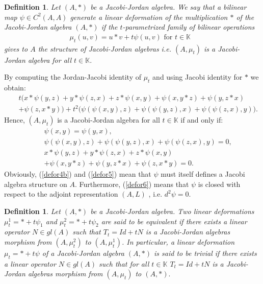 \documentclass[12pt]{amsart}
\newtheorem{definition}[Theorem]{Definition}
\begin{document}
	\begin{definition}
		Let $(A,\ast)$ be a  Jacobi-Jordan algebra. We say that a bilinear map $\psi\in C^2(A,A)$ generate a linear  deformation of the multiplication $\ast$ of the Jacobi-Jordan algebra $(A,\ast)$ if the $t$-parametrized family of bilinear operations
		\begin{eqnarray}
			\mu_t(u, v)=u\ast v+t\psi(u,v) \mbox{ for $t\in\mathbb{K}$ }
		\end{eqnarray}
		gives to $A$ the structure of Jacobi-Jordan algebras i.e. $(A,\mu_t)$ is a Jacobi-Jordan algebra for all $t\in \mathbb{K}.$
	\end{definition}
	By computing the Jordan-Jacobi identity of $\mu_t$ and using Jacobi identity for $\ast$ we obtain:
	\begin{eqnarray}
		&&t\Big(x\ast\psi(y,z)+y\ast\psi(z,x)+z\ast\psi(x,y)+\psi(x,y\ast z)+\psi(y,z\ast x)\nonumber\\
		&&+\psi(z,x\ast y)\Big)+t^2\Big(\psi(\psi(x,y),z)+\psi(\psi(y,z),x)+\psi(\psi(z,x),y)\Big).\nonumber
	\end{eqnarray}
	Hence, $(A,\mu_t)$ is a Jacobi-Jordan algebra for all $t\in \mathbb{K}$ if and only if:
	\begin{eqnarray}
		&&\psi(x,y)=\psi(y,x), \label{defor4b}\\
		&& \psi(\psi(x,y),z)+ \psi(\psi(y,z),x)+ \psi(\psi(z,x),y)=0, \label{defor5}\\
		&&x\ast\psi(y,z)+y\ast\psi(z,x)+z\ast\psi(x,y)\nonumber\\
		&&+\psi(x,y\ast z)+\psi(y,z\ast x)+\psi(z,x\ast y)=0.\label{defor6}
	\end{eqnarray}
	Obviously, (\ref{defor4b}) and (\ref{defor5}) mean that $\psi$ must itself defines a Jacobi algebra structure on $A$.
	Furthermore, (\ref{defor6}) means that $\psi$ is closed with respect to the adjoint representation $(A, L)$ , i.e. $d^2\psi=0.$
	\begin{definition}
		Let $(A, \ast)$ be a Jacobi-Jordan algebra. Two linear deformations 
		$\mu^1_t=\ast+t\psi_1$ and $\mu^2_t=\ast+t\psi_2$ are said to be equivalent if there exists
		a linear operator $N\in gl(A)$ such that 
		$T_t=Id+tN$ is a Jacobi-Jordan algebras
		morphism from $(A, \mu^2_t)$ to $(A, \mu^1_t)$. In particular, a linear deformation
		$\mu_t=\ast+t\psi$ of a Jacobi-Jordan algebra $(A, \ast)$ is said to be trivial if there
		exists a linear operator $N\in gl(A)$ such that for all $t\in\mathbb{K}$
		$T_t=Id+tN$ is  a Jacobi-Jordan algebras
		morphism from $(A, \mu_t)$ to $(A, \ast).$
	\end{definition}
\end{document}
